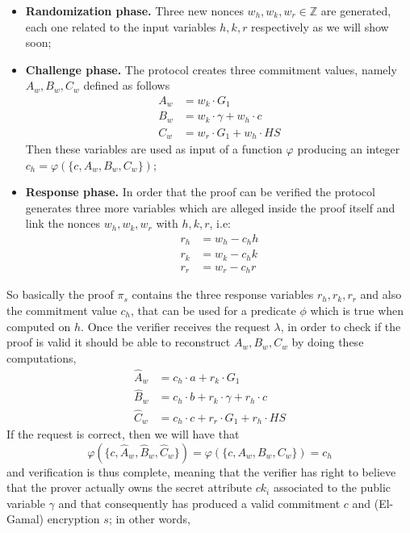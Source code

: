 \documentclass[twocolumn]{article}
\begin{document}
\begin{itemize}
    \item \textbf{Randomization phase.} Three new nonces $w_h, w_k, w_r\in \mathbb{Z}$ are generated, each one related to the input variables $h, k, r$ respectively as we will show soon; 
    \item \textbf{Challenge phase.} The protocol creates three commitment values, namely $A_w, B_w, C_w$ defined as follows
    \begin{align*}
        A_w &= w_k\cdot G_1 \\ 
        B_w &= w_k\cdot\gamma + w_h\cdot c \\
        C_w &= w_r\cdot G_1 + w_h \cdot HS
    \end{align*}
    Then these variables are used as input of a function $\varphi$ producing an integer $c_h=\varphi(\{c,A_w,B_w,C_w\})$;
    \item \textbf{Response phase.} In order that the proof can be verified the protocol generates three more variables which are alleged inside the proof itself and link the nonces $w_h, w_k, w_r$ with $h, k, r$, i.e:
    \begin{align*}
        r_h &= w_h - c_h h \\
        r_k &= w_k - c_h k \\
        r_r &= w_r - c_h r
    \end{align*}
\end{itemize}
So basically the proof $\pi_s$ contains the three response variables $r_h, r_k, r_r$ and also the commitment value $c_h$, that can be used for a predicate $\phi$ which is true when computed on $h$. Once the verifier receives the request $\lambda$, in order to check if the proof is valid it should be able to reconstruct  $A_w, B_w, C_w$ by doing these computations,
\begin{align*}
\widehat{A}_w &= c_h\cdot a + r_k\cdot G_1 \\
\widehat{B}_w &= c_h\cdot b + r_k\cdot \gamma + r_h\cdot c \\
\widehat{C}_w &= c_h\cdot c + r_r\cdot G_1 + r_h\cdot HS
\end{align*}
If the request is correct, then we will have that 
\begin{equation}\label{challenge pi_s}
\varphi(\{c,\widehat{A}_w,\widehat{B}_w,\widehat{C}_w\}) = \varphi(\{c,A_w,B_w,C_w\}) = c_h
\end{equation}
and verification is thus complete, meaning that the verifier has right to believe that the prover actually owns the secret attribute $ck_i$ associated to the public variable $\gamma$ and that consequently has produced a valid commitment $c$ and (El-Gamal) encryption $s$; in other words,
\end{document}
